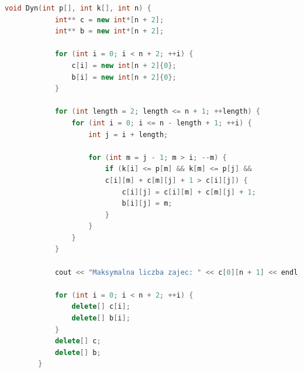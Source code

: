 \documentclass{article}
\theoremstyle{definition}
\begin{document}
	\begin{lstlisting}[language=C++, tabsize=3, caption={Implementacja wersji opartej na programowaniu dynamicznym}]
		void Dyn(int p[], int k[], int n) {
			int** c = new int*[n + 2];
			int** b = new int*[n + 2];
			
			for (int i = 0; i < n + 2; ++i) {
				c[i] = new int[n + 2]{0};
				b[i] = new int[n + 2]{0};
			}
			
			for (int length = 2; length <= n + 1; ++length) {
				for (int i = 0; i <= n - length + 1; ++i) {
					int j = i + length;
					
					for (int m = j - 1; m > i; --m) {
						if (k[i] <= p[m] && k[m] <= p[j] &&
						c[i][m] + c[m][j] + 1 > c[i][j]) {
							c[i][j] = c[i][m] + c[m][j] + 1;
							b[i][j] = m;
						}
					}
				}
			}
			
			cout << "Maksymalna liczba zajec: " << c[0][n + 1] << endl;
			
			for (int i = 0; i < n + 2; ++i) {
				delete[] c[i];
				delete[] b[i];
			}
			delete[] c;
			delete[] b;
		}
	\end{lstlisting}
\end{document}
